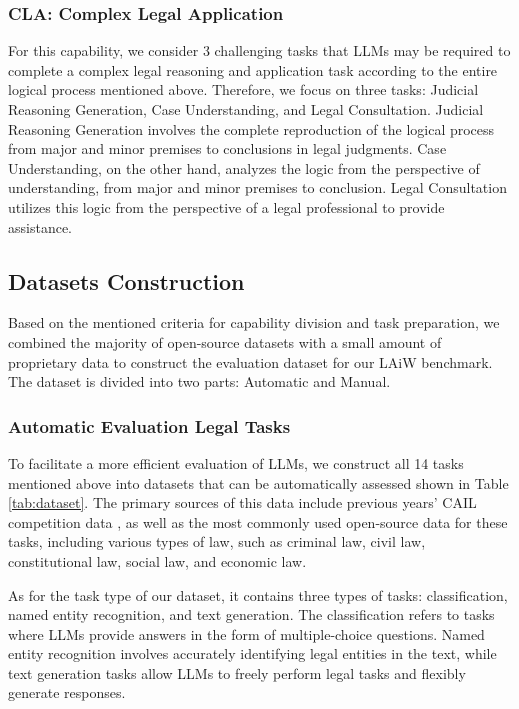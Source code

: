 \subsubsection{CLA: Complex Legal Application} 
For this capability, we consider 3 challenging tasks that LLMs may be required to complete a complex legal reasoning and application task according to the entire logical process mentioned above.
Therefore, we focus on three tasks: Judicial Reasoning Generation, Case Understanding, and Legal Consultation.
Judicial Reasoning Generation involves the complete reproduction of the logical process from major and minor premises to conclusions in legal judgments. 
Case Understanding, on the other hand, analyzes the logic from the perspective of understanding, from major and minor premises to conclusion. 
Legal Consultation utilizes this logic from the perspective of a legal professional to provide assistance.

\subsection{Datasets Construction}
\label{Tasks-Construct}
Based on the mentioned criteria for capability division and task preparation, we combined the majority of open-source datasets with a small amount of proprietary data to construct the evaluation dataset for our LAiW benchmark. The dataset is divided into two parts: Automatic and Manual.

\subsubsection{Automatic Evaluation Legal Tasks}
To facilitate a more efficient evaluation of LLMs, we construct all 14 tasks mentioned above into datasets that can be automatically assessed shown in Table \ref{tab:dataset}.
The primary sources of this data include previous years' CAIL competition data \cite{xiao2018cail2018, zhang2022recognition, huang2023high}, as well as the most commonly used open-source data \cite{ge2021learning, wu2020biased, LAWGPT-zh} for these tasks, including various types of law, such as criminal law, civil law, constitutional law, social law, and economic law.

As for the task type of our dataset, it contains three types of tasks: classification, named entity recognition, and text generation. 
The classification refers to tasks where LLMs provide answers in the form of multiple-choice questions. 
Named entity recognition involves accurately identifying legal entities in the text, while text generation tasks allow LLMs to freely perform legal tasks and flexibly generate responses. 

